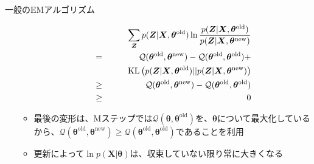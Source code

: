 \documentclass[dvipdfmx,notheorems,t]{beamer}
\begin{document}
\begin{frame}{一般のEMアルゴリズム}
\begin{itemize}
\begin{itemize}
\begin{eqnarray}
			&& \qquad \sum_{\bm{Z}} p(\bm{Z} | \bm{X}, \bm{\theta}^\mathrm{old}) \ln \frac{p(\bm{Z} | \bm{X}, \bm{\theta}^\mathrm{old})}{p(\bm{Z} | \bm{X}, \bm{\theta}^\mathrm{new})} \nonumber \\
			&=& \mathcal{Q}(\bm{\theta}^\mathrm{old}, \bm{\theta}^\mathrm{new}) - \mathcal{Q}(\bm{\theta}^\mathrm{old}, \bm{\theta}^\mathrm{old}) + \nonumber \\
			&& \qquad \operatorname{KL} \left( p(\bm{Z} | \bm{X}, \bm{\theta}^\mathrm{old}) || p(\bm{Z} | \bm{X}, \bm{\theta}^\mathrm{new}) \right) \\
			&\ge& \mathcal{Q}(\bm{\theta}^\mathrm{old}, \bm{\theta}^\mathrm{new}) - \mathcal{Q}(\bm{\theta}^\mathrm{old}, \bm{\theta}^\mathrm{old}) \\
			&\ge& 0 \nonumber
		\end{eqnarray}
		
		\item 最後の変形は、Mステップでは$\mathcal{Q}(\bm{\theta}, \bm{\theta}^\mathrm{old})$を、$\bm{\theta}$について最大化しているから、$\mathcal{Q}(\bm{\theta}^\mathrm{old}, \bm{\theta}^\mathrm{new}) \ge \mathcal{Q}(\bm{\theta}^\mathrm{old}, \bm{\theta}^\mathrm{old})$であることを利用
		\newline
		\item 更新によって$\ln p(\bm{X} | \bm{\theta})$は、\alert{収束していない限り常に大きくなる}
	\end{itemize}
\end{itemize}

\end{frame}
\end{document}
